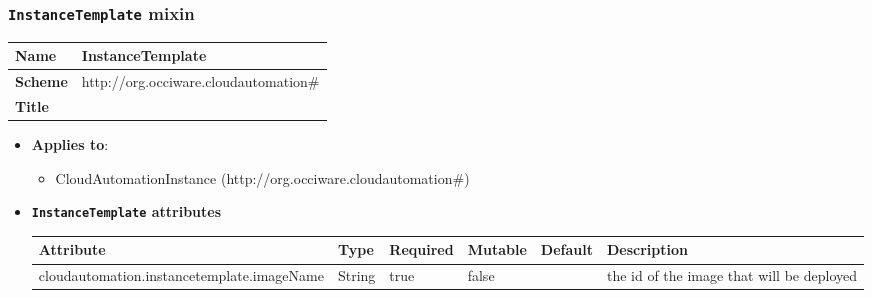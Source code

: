 \subsubsection{\texttt{InstanceTemplate} mixin}
\begin{center}
\begin{tabular}{|l|l|}
  \hline
  \textbf{Name} & InstanceTemplate \\
  \hline  
  \textbf{Scheme} & http://org.occiware.cloudautomation\# \\
  \hline
  \textbf{Title} &  \\
  \hline
\end{tabular}
\end{center}
\begin{itemize}
\item \textbf{Applies to}:
\begin{itemize}
	\item CloudAutomationInstance (http://org.occiware.cloudautomation\#)
\end{itemize}
\end{itemize} 

\begin{itemize}
\item \textbf{\texttt{InstanceTemplate} attributes}

\begin{tabularx}{\textwidth}{|l|l|p{1.4cm}|p{1.3cm}|l|X|}
  \hline
  \textbf{Attribute} & \textbf{Type} & \textbf{Required} & \textbf{Mutable} & \textbf{Default} & \textbf{Description} \\
  \hline  
  cloudautomation.instancetemplate.imageName & String & true & false &  & the id of the image that will be deployed \\
  \hline
\end{tabularx}
\end{itemize}


 
